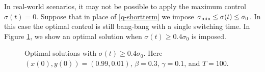 \documentclass[english,12pt,letter]{article}
\newcommand{\Rnot}{\sigma_0}
\begin{document}
In real-world scenarios, it may not be possible to apply the maximum control $\sigma(t)=0$.
Suppose that in place of \eqref{q-shortterm} we impose $\sigma_\textup{min} \le \sigma(t) \le \Rnot$.
In this case the optimal control is still bang-bang with a single switching time.
In Figure \ref{fig:example_2}, we show an optimal solution when $\sigma(t)\ge 0.4\Rnot$ is imposed.

\begin{figure}
    \centering
    \caption{Optimal solutions with $\sigma(t)\ge 0.4\Rnot$.  Here $(x(0),y(0)) = (0.99,0.01)$, $\beta=0.3$, $\gamma=0.1$, and $T=100$.\label{fig:example_2}}
\end{figure}
\end{document}
